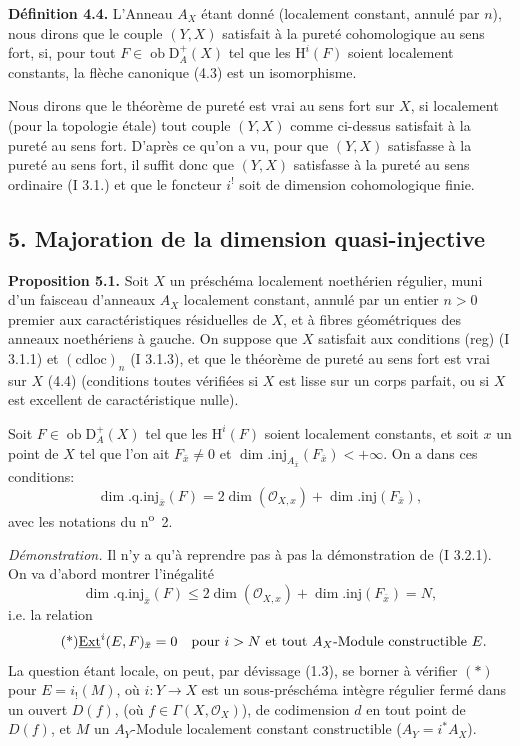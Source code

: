 \documentclass[11pt]{article}
\renewcommand{\H}{\mathrm{H}}
\DeclareMathOperator{\Ext}{Ext}
\newcommand{\D}{\mathrm{D}}
\newcommand{\ob}{\operatorname{ob}}
\providecommand{\ob}{\operatorname{ob}}
\begin{document}
\textbf{Définition 4.4.} L'Anneau $A_X$ étant donné (localement constant, annulé par $n$), nous dirons que le couple $(Y,X)$ satisfait à la pureté cohomologique au sens fort, si, pour tout $F\in\ob\D_A^+(X)$ tel que les $\H^i(F)$ soient localement constants, la flèche canonique (4.3) est un isomorphisme.

Nous dirons que le théorème de pureté est vrai au sens fort sur $X$, si localement (pour la topologie étale) tout couple $(Y,X)$ comme ci-dessus satisfait à la pureté au sens fort. D'après ce qu'on a vu, pour que $(Y,X)$ satisfasse à la pureté au sens fort, il suffit donc que $(Y,X)$ satisfasse à la pureté au sens ordinaire (I 3.1.) et que le foncteur $i^!$ soit de dimension cohomologique finie.

\subsection*{5. Majoration de la dimension quasi-injective}

\textbf{Proposition 5.1.} Soit $X$ un préschéma localement noethérien régulier, muni d'un faisceau d'anneaux $A_X$ localement constant, annulé par un entier $n>0$ premier aux caractéristiques résiduelles de $X$, et à fibres géométriques des anneaux noethériens à gauche. On suppose que $X$ satisfait aux conditions (reg) (I 3.1.1) et $(\mathrm{cdloc})_n$ (I 3.1.3), et que le théorème de pureté au sens fort est vrai sur $X$ (4.4) (conditions toutes vérifiées si $X$ est lisse sur un corps parfait, ou si $X$ est excellent de caractéristique nulle).

Soit $F\in\ob\D_A^+(X)$ tel que les $\H^i(F)$ soient localement constants, et soit $x$ un point de $X$ tel que l'on ait $F_{\bar{x}}\neq0$ et $\dim.\mathrm{inj}_{A_{\bar{x}}}(F_{\bar{x}})<+\infty$. On a dans ces conditions:
\[
        \dim.\mathrm{q.inj}_{\bar{x}}(F)=2\dim(\mathcal{O}_{X,x})+\dim.\mathrm{inj}(F_{\bar{x}}),
\]
avec les notations du n\textsuperscript{o}~2.

\emph{Démonstration.} Il n'y a qu'à reprendre pas à pas la démonstration de (I 3.2.1). On va d'abord montrer l'inégalité
\[
        \dim.\mathrm{q.inj}_{\bar{x}}(F)\leq 2\dim(\mathcal{O}_{X,x})+\dim.\mathrm{inj}(F_{\bar{x}})=N,
\]
i.e. la relation
\begin{equation}\tag{*}
        \underline{\Ext}^{i}(E,F)_{\bar{x}}=0\quad\hbox{pour } i>N\hbox{ et tout }A_X\hbox{-Module constructible }E.
\end{equation}
La question étant locale, on peut, par dévissage (1.3), se borner à vérifier $(*)$ pour $E=i_!(M)$, où $i:Y\to X$ est un sous-préschéma intègre régulier fermé dans un ouvert $D(f)$, (où $f\in\Gamma(X,\mathcal{O}_X)$), de codimension $d$ en tout point de $D(f)$, et $M$ un $A_Y$-Module localement constant constructible ($A_Y=i^*A_X$).
\end{document}
